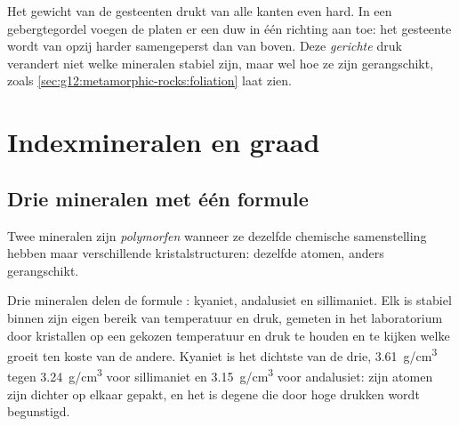 Het gewicht van de gesteenten drukt van alle kanten even hard. In een gebergtegordel
voegen de platen er een duw in één richting aan toe: het gesteente wordt van opzij harder
samengeperst dan van boven. Deze \emph{gerichte} druk verandert niet welke
mineralen stabiel zijn, maar wel hoe ze zijn gerangschikt, zoals
\cref{sec:g12:metamorphic-rocks:foliation} laat zien.

\section{Indexmineralen en graad}

\subsection{Drie mineralen met één formule}

\begin{definition}[Polymorf]\label{def:g12:metamorphic-rocks:polymorph}
Twee mineralen zijn \emph{polymorfen} wanneer ze dezelfde
chemische samenstelling hebben maar verschillende kristalstructuren: dezelfde atomen,
anders gerangschikt.
\end{definition}

Drie mineralen delen de formule : kyaniet, andalusiet en
sillimaniet. Elk is stabiel binnen zijn eigen bereik van temperatuur en druk,
gemeten in het laboratorium door kristallen op een gekozen temperatuur en
druk te houden en te kijken welke  groeit ten koste van de andere. Kyaniet is het dichtste van de drie,
\qty{3.61}{g/cm^3} tegen \qty{3.24}{g/cm^3} voor sillimaniet en
\qty{3.15}{g/cm^3} voor andalusiet: zijn atomen zijn dichter op elkaar gepakt, en het
is degene die door hoge drukken wordt begunstigd.

